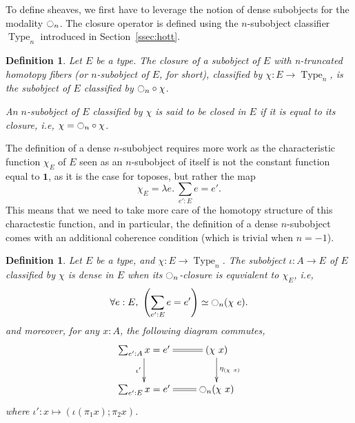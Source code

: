 \documentclass[conference]{IEEEtran}
\newtheorem{defi}[thm]{Definition}
\newcommand{\ie}{i.e,\xspace}
\DeclareMathOperator{\Type}{Type}
\DeclareMathOperator{\HProp}{HProp}
\newcommand{\modal}{\ensuremath{\ocircle}}
\newcommand \one {\mathbf{1}}
\begin{document}


To define sheaves, we first have to leverage the notion of dense
subobjects for the modality $\modal_n$. The closure operator is defined
using the $n$-subobject classifier $\Type_n$ introduced in
Section~\ref{ssec:hott}.

\begin{defi}
  Let $E$ be a type. The {\em closure} of a subobject of $E$ with
  n-truncated homotopy fibers (or $n$-subobject of $E$, for short),
  classified by $\chi : E \to \Type_n$, is the subobject of $E$
  classified by $\modal_n \circ \chi$.

  An $n$-subobject of $E$ classified by $\chi$ is said to be {\em
    closed in $E$} if it is equal to its closure, \ie
  $\chi = \modal_n \circ \chi$.
\end{defi}

The definition of a dense $n$-subobject requires more work as the
characteristic function $\chi_E$ of $E$ seen as an $n$-subobject of
itself is not the constant function equal to $\one$, as it is the case
for toposes, but rather the map 
%
$$\chi_E  = \lambda e . \ \sum_{e':E} e=e'.$$
%
This means that we need to take more care of the homotopy structure of
this charactestic function, and in particular, the definition of a
dense $n$-subobject comes with an additional coherence condition
(which is trivial when $n=-1$).

\begin{defi}
  Let $E$ be a type, and $\chi:E \to \Type_n$. The subobject $\iota :
  A \to E$ of $E$
  classified by $\chi$ is {\em dense} in $E$ when its $\modal_n$-closure
  is equvialent to $\chi_E$, \ie
  $$\forall e:E,~ \left(\sum_{e':E} e=e'\right) \simeq \modal_n
  (\chi~e).$$
  and moreover, for any $x:A$, the following diagram 
  commutes, 
  $$\xymatrix{
    \sum_{e':A} x = e' \ar@{=}[r] \ar[d]_{\iota'} & (\chi~x) \ar[d]^{\eta_{(\chi~x)}}\\
    \sum_{e':E} x = e' \ar@{=}[r] & \modal_n (\chi~x)
  }$$
  where $\iota': x \mapsto (\iota (\pi_1 x) ; \pi_2 x)$.
\end{defi}
\end{document}
